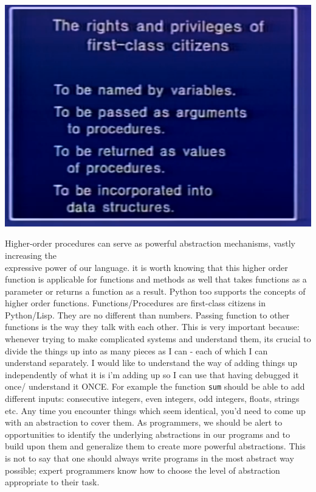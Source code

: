 \documentclass[a4paper,twoside]{article}
\numberwithin{equation}{section}
\begin{document}
\begin{center}
    \includegraphics[scale=0.2]{assets/first-class-citizens.png}
\end{center}
Higher-order procedures can serve as powerful abstraction mechanisms, vastly increasing the \\
expressive power of our language. it is worth knowing that this higher order function
is applicable for functions and methods as well that takes functions as a parameter or
returns a function as a result. Python too supports the concepts of higher order functions.
Functions/Procedures are first-class citizens in Python/Lisp. They are no different than numbers.
Passing function to other functions is the way they talk with each other.
This is very important because: whenever trying to make complicated systems and
understand them, its crucial to divide the things up into as many pieces as I can -
each of which I can understand separately. I would like to  understand the way of
adding things up independently of what it is i'm adding up so I can use that having
debugged it once/ understand it ONCE. For example the function
\texttt{sum} should be able to add different inputs: consecutive integers,
even integers, odd integers, floats, strings etc. Any time you encounter things which seem
identical, you'd need to come up with an abstraction to cover them. \newline
As programmers, we should be alert to opportunities to identify the
underlying abstractions in our programs and to build upon them and
generalize them to create more powerful abstractions. This is not to
say that one should always write programs in the most abstract way
possible; expert programmers know how to choose the level of abstraction appropriate to their task.
\end{document}
